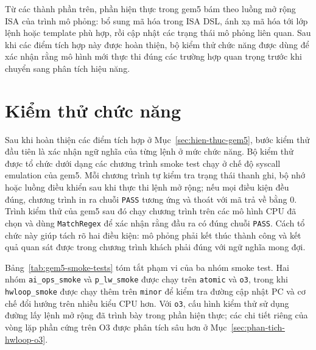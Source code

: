 \documentclass[../DoAn.tex]{subfiles}
\begin{document}
Từ các thành phần trên, phần hiện thực trong gem5 bám theo luồng mở rộng ISA của trình mô phỏng: bổ sung mã hóa trong ISA DSL, ánh xạ mã hóa tới lớp lệnh hoặc template phù hợp, rồi cập nhật các trạng thái mô phỏng liên quan. Sau khi các điểm tích hợp này được hoàn thiện, bộ kiểm thử chức năng được dùng để xác nhận rằng mô hình mới thực thi đúng các trường hợp quan trọng trước khi chuyển sang phân tích hiệu năng.

\section{Kiểm thử chức năng}
\label{sec:kiem-thu-chuc-nang-gem5}

Sau khi hoàn thiện các điểm tích hợp ở Mục~\ref{sec:hien-thuc-gem5}, bước kiểm thử đầu tiên là xác nhận ngữ nghĩa của từng lệnh ở mức chức năng. Bộ kiểm thử được tổ chức dưới dạng các chương trình smoke test chạy ở chế độ syscall emulation của gem5. Mỗi chương trình tự kiểm tra trạng thái thanh ghi, bộ nhớ hoặc luồng điều khiển sau khi thực thi lệnh mở rộng; nếu mọi điều kiện đều đúng, chương trình in ra chuỗi \texttt{PASS} tương ứng và thoát với mã trả về bằng 0. Trình kiểm thử của gem5 sau đó chạy chương trình trên các mô hình CPU đã chọn và dùng \texttt{MatchRegex} để xác nhận rằng đầu ra có đúng chuỗi \texttt{PASS}. Cách tổ chức này giúp tách rõ hai điều kiện: mô phỏng phải kết thúc thành công và kết quả quan sát được trong chương trình khách phải đúng với ngữ nghĩa mong đợi.

Bảng~\ref{tab:gem5-smoke-tests} tóm tắt phạm vi của ba nhóm smoke test. Hai nhóm \texttt{ai\_ops\_smoke} và \texttt{p\_lw\_smoke} được chạy trên \texttt{atomic} và \texttt{o3}, trong khi \texttt{hwloop\_smoke} được chạy thêm trên \texttt{minor} để kiểm tra đường cập nhật PC và cơ chế đổi hướng trên nhiều kiểu CPU hơn. Với \texttt{o3}, cấu hình kiểm thử sử dụng đường lấy lệnh mở rộng đã trình bày trong phần hiện thực; các chi tiết riêng của vòng lặp phần cứng trên O3 được phân tích sâu hơn ở Mục~\ref{sec:phan-tich-hwloop-o3}.
\end{document}

